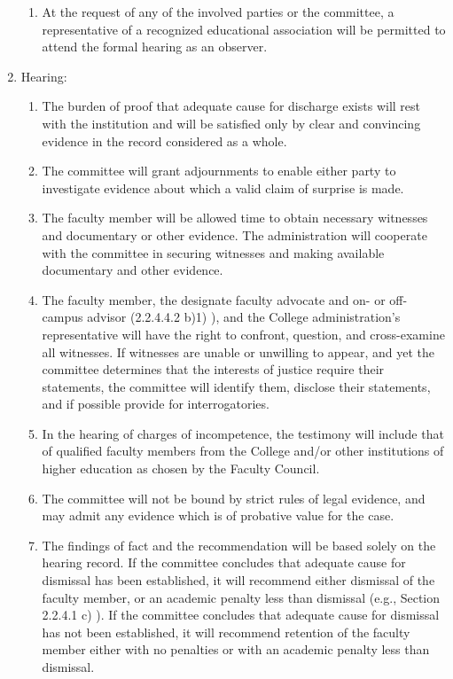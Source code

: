 \documentclass[letterpaper, 11pt]{article}
\begin{document}
\begin{enumerate}[label=\alph*)]
{\begin{enumerate}[label=\arabic*)]
							\item{At the request of any of the involved parties or the committee, a representative of a recognized educational association will be permitted to attend the formal hearing as an observer.}
						\end{enumerate}
					}
					\item{Hearing:
						\begin{enumerate}[label=\arabic*)]
							\item{The burden of proof that adequate cause for discharge exists will rest with the institution and will be satisfied only by clear and convincing evidence in the record considered as a whole.}
							\item{The committee will grant adjournments to enable either party to investigate evidence about which a valid claim of surprise is made.}
							\item{The faculty member will be allowed time to obtain necessary witnesses and documentary or other evidence.  The administration will cooperate with the committee in securing witnesses and making available documentary and other evidence.}
							\item{The faculty member, the designate faculty advocate and on- or off-campus advisor (2.2.4.4.2  b)1) ), and the College administration's representative will have the right to confront, question, and cross-examine all witnesses.  If witnesses are unable or unwilling to appear, and yet the committee determines that the interests of justice require their statements, the committee will identify them, disclose their statements, and if possible provide for interrogatories.}
							\item{In the hearing of charges of incompetence, the testimony will include that of qualified faculty members from the College and/or other institutions of higher education as chosen by the Faculty Council.}
							\item{The committee will not be bound by strict rules of legal evidence, and may admit any evidence which is of probative value for the case.}
							\item{The findings of fact and the recommendation will be based solely on the hearing record.
								If the committee concludes that adequate cause for dismissal has been established, it will recommend either dismissal of the faculty member, or an academic penalty less than dismissal (e.g., Section 2.2.4.1 c) ).  If the committee concludes that adequate cause for dismissal has not been established, it will recommend retention of the faculty member either with no penalties or with an academic penalty less than dismissal.}

\end{enumerate}}
\end{enumerate}
\end{document}
